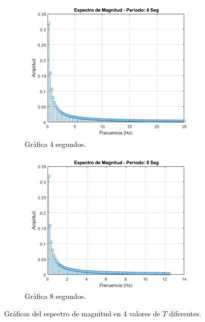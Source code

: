 \documentclass[7pt]{article}
\begin{document}
\begin{figure}[H]
\begin{subfigure}[h]{0.45\linewidth}
            \includegraphics[width=\linewidth]{img/figure6_C.png}
            \caption{Gráfica 4 segundos.}
            \label{figure6_C}
        \end{subfigure}
        \begin{subfigure}[h]{0.45\linewidth}
            \includegraphics[width=\linewidth]{img/figure6_D.png}
            \caption{Gráfica 8 segundos.}
            \label{figure6_D}
        \end{subfigure}
        \caption{Gráficas del espectro de magnitud en 4 valores de $T$ diferentes.}
        \label{figure6}
    \end{figure}
\end{document}
